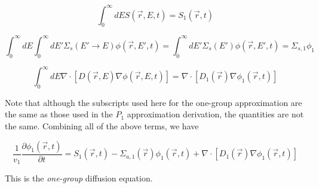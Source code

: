 \documentclass[12pt]{article}
\newcommand{\rvec}{\ensuremath{\vec{r}}}
\newcommand{\sigsi}{\ensuremath{\Sigma_{s,1}}}
\begin{document}
\begin{equation*}
\int_0^{\infty}dES(\rvec,E,t) = S_1(\rvec,t)
\end{equation*}

\begin{equation*}
\int_0^{\infty}dE\int_0^{\infty}dE'\Sigma_s(E'\rightarrow E)\phi(\rvec,E',t) =
\int_0^{\infty}dE'\Sigma_s(E')\phi(\rvec,E',t) = \sigsi\phi_1
\end{equation*}

\begin{equation*}
\int_0^{\infty}dE\nabla\cdot[D(\rvec,E)\nabla\phi(\rvec,E,t)]=\nabla\cdot[D_1(\rvec)\nabla\phi_1(\rvec,t)]
\end{equation*}

Note that although the subscripts used here for the one-group approximation are the same as those used in
the $P_1$ approximation derivation, the quantities are not the same. Combining all of the above terms, we
have

\begin{equation*}
\frac{1}{v_1}\frac{\partial \phi_1(\rvec,t)}{\partial t} = S_1(\rvec,t) - 
\Sigma_{a,1}(\rvec)\phi_1(\rvec,t) + \nabla\cdot[D_1(\rvec)\nabla\phi_1(\rvec,t)]
\end{equation*}

This is the \emph{one-group} diffusion equation.
\end{document}

